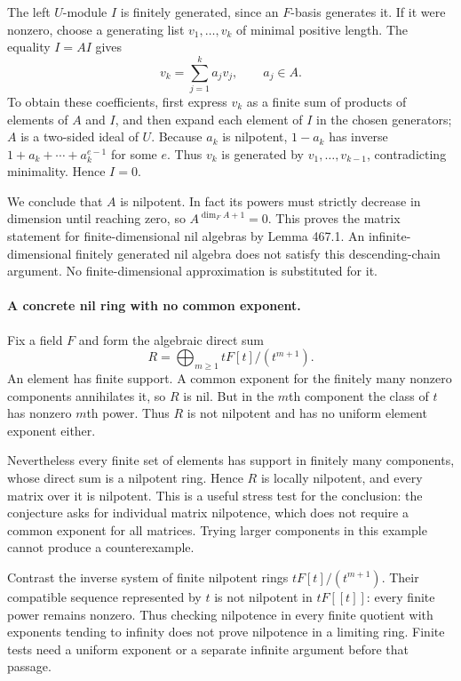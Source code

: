 \documentclass[11pt]{article}
\begin{document}
The left $U$-module $I$ is finitely generated, since an $F$-basis generates
it. If it were nonzero, choose a generating list $v_1,\ldots,v_k$ of
minimal positive length. The equality $I=AI$ gives
\[
 v_k=\sum_{j=1}^k a_jv_j,\qquad a_j\in A.
\]
To obtain these coefficients, first express $v_k$ as a finite sum of
products of elements of $A$ and $I$, and then expand each element of $I$
in the chosen generators; $A$ is a two-sided ideal of $U$.
Because $a_k$ is nilpotent, $1-a_k$ has inverse
$1+a_k+\cdots+a_k^{e-1}$ for some $e$. Thus $v_k$ is generated by
$v_1,\ldots,v_{k-1}$, contradicting minimality. Hence $I=0$.

We conclude that $A$ is nilpotent. In fact its powers must strictly
decrease in dimension until reaching zero, so $A^{\dim_F A+1}=0$.
This proves the matrix statement for finite-dimensional nil algebras by
Lemma 467.1. An infinite-dimensional finitely generated nil algebra does
not satisfy this descending-chain argument. No finite-dimensional
approximation is substituted for it.

\paragraph{A concrete nil ring with no common exponent.}
Fix a field $F$ and form the algebraic direct sum
\[
 R=\bigoplus_{m\ge1}tF[t]/(t^{m+1}).
\]
An element has finite support. A common exponent for the finitely many
nonzero components annihilates it, so $R$ is nil. But in the $m$th
component the class of $t$ has nonzero $m$th power. Thus $R$ is not
nilpotent and has no uniform element exponent either.

Nevertheless every finite set of elements has support in finitely many
components, whose direct sum is a nilpotent ring. Hence $R$ is locally
nilpotent, and every matrix over it is nilpotent. This is a useful stress
test for the conclusion: the conjecture asks for individual matrix
nilpotence, which does not require a common exponent for all matrices.
Trying larger components in this example cannot produce a counterexample.

Contrast the inverse system of finite nilpotent rings
$tF[t]/(t^{m+1})$. Their compatible sequence represented by $t$ is not
nilpotent in $tF[[t]]$: every finite power remains nonzero. Thus checking
nilpotence in every finite quotient with exponents tending to infinity
does not prove nilpotence in a limiting ring. Finite tests need a
uniform exponent or a separate infinite argument before that passage.
\end{document}
